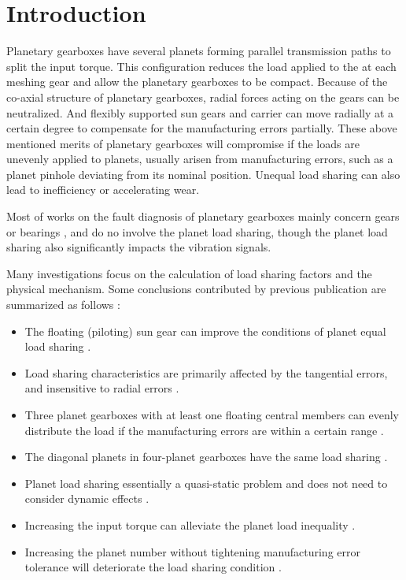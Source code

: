 \documentclass[a4paper,fleqn]{cas-sc}%
\begin{document}
\section{Introduction}
\par Planetary gearboxes have several planets forming parallel transmission paths to split the input torque. This configuration reduces the load applied to the at each meshing gear and allow the planetary gearboxes to be compact. Because of the co-axial structure of planetary gearboxes, radial forces acting on the gears can be neutralized. And flexibly supported sun gears and carrier can move radially at a certain degree to compensate for the manufacturing errors partially. These above mentioned merits of planetary gearboxes will compromise if the loads are unevenly applied to planets, usually arisen from manufacturing errors, such as a planet pinhole deviating from its nominal position. Unequal load sharing can also lead to inefficiency or accelerating wear. 
\par  Most of works  on the fault diagnosis of planetary gearboxes mainly concern gears \cite{Feng2012} or bearings \cite{Zhao2019}, and do no involve the planet load sharing, though the planet load sharing also significantly impacts the vibration signals.
\par Many investigations focus on the calculation of load sharing factors and the physical mechanism. Some conclusions contributed by previous publication are summarized as follows \cite{Singh2010511-530}:
\begin{itemize}
    \item The floating (piloting) sun gear can improve the conditions of planet equal load sharing \cite{seager1970}.
    \item Load sharing characteristics are primarily affected by the tangential errors, and insensitive to radial errors \cite{Bodas2004}. 
    \item Three planet gearboxes with at least one floating central members can evenly distribute the load if the manufacturing errors are within a certain range \cite{Singh2010511-530}.
    \item The diagonal planets in four-planet gearboxes have the same load sharing \cite{Ligata2008}.
    \item Planet load sharing essentially a quasi-static problem and does not need to consider dynamic effects \cite{Kahraman1994}.
    \item Increasing the input torque can alleviate the planet load inequality \cite{Ligata2008}.
    \item Increasing the planet number without tightening manufacturing error tolerance will deteriorate the load sharing condition \cite{Singh2005}.
\end{itemize}
\end{document}
